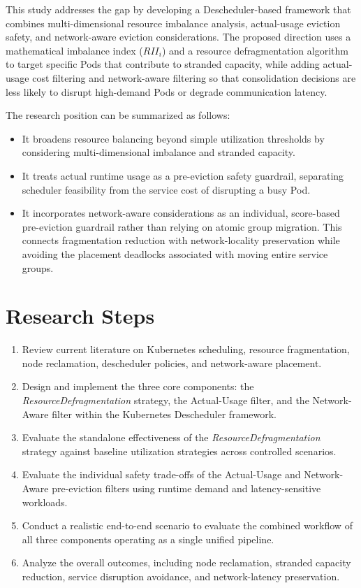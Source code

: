 This study addresses the gap by developing a Descheduler-based framework that combines multi-dimensional resource imbalance analysis, actual-usage eviction safety, and network-aware eviction considerations. The proposed direction uses a mathematical imbalance index ($RII_i$) and a resource defragmentation algorithm to target specific Pods that contribute to stranded capacity, while adding actual-usage cost filtering and network-aware filtering so that consolidation decisions are less likely to disrupt high-demand Pods or degrade communication latency.

The research position can be summarized as follows:
\begin{itemize}
    \item It broadens resource balancing beyond simple utilization thresholds by considering multi-dimensional imbalance and stranded capacity.
    \item It treats actual runtime usage as a pre-eviction safety guardrail, separating scheduler feasibility from the service cost of disrupting a busy Pod.
    \item It incorporates network-aware considerations as an individual, score-based pre-eviction guardrail rather than relying on atomic group migration. This connects fragmentation reduction with network-locality preservation while avoiding the placement deadlocks associated with moving entire service groups.
\end{itemize}

\section{Research Steps}
\label{sec:langkahPenelitian}

\begin{enumerate}
    \item Review current literature on Kubernetes scheduling, resource fragmentation, node reclamation, descheduler policies, and network-aware placement.
    \item Design and implement the three core components: the \textit{ResourceDefragmentation} strategy, the Actual-Usage filter, and the Network-Aware filter within the Kubernetes Descheduler framework.
    \item Evaluate the standalone effectiveness of the \textit{ResourceDefragmentation} strategy against baseline utilization strategies across controlled scenarios.
    \item Evaluate the individual safety trade-offs of the Actual-Usage and Network-Aware pre-eviction filters using runtime demand and latency-sensitive workloads.
    \item Conduct a realistic end-to-end scenario to evaluate the combined workflow of all three components operating as a single unified pipeline.
    \item Analyze the overall outcomes, including node reclamation, stranded capacity reduction, service disruption avoidance, and network-latency preservation.
\end{enumerate}

